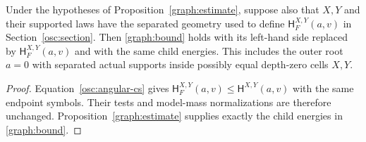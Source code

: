 \begin{corollary}\label{graph:separated-form}
Under the hypotheses of Proposition~\ref{graph:estimate}, suppose also
that $X,Y$ and their supported laws have the separated geometry used
to define $\mathsf H_F^{X,Y}(a,v)$ in Section~\ref{osc:section}.  Then
\eqref{graph:bound} holds with its left-hand side replaced by
$\mathsf H_F^{X,Y}(a,v)$ and with the same child energies.  This includes
the outer root $a=0$ with separated actual supports inside possibly
equal depth-zero cells $X,Y$.
\end{corollary}

\begin{proof}
Equation~\eqref{osc:angular-cs} gives
$\mathsf H_F^{X,Y}(a,v)\le\mathsf H^{X,Y}(a,v)$ with the same endpoint
symbols.  Their tests and model-mass normalizations are therefore
unchanged.  Proposition~\ref{graph:estimate} supplies exactly the child
energies in \eqref{graph:bound}.
\end{proof}
